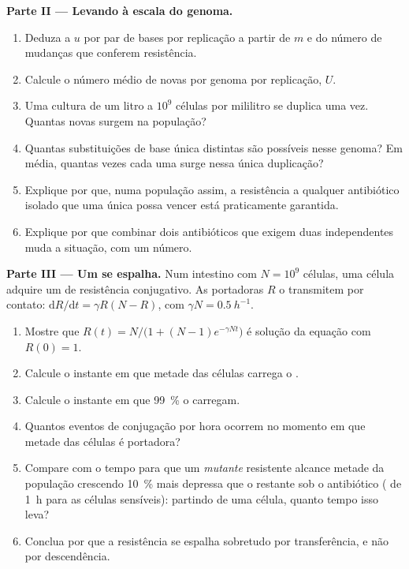 \begin{problem}
\medskip
\noindent\textbf{Parte II --- Levando à escala do genoma.}
\begin{enumerate}[resume]
  \item Deduza a  $u$ por par de bases por replicação a
        partir de $m$ e do número de mudanças que conferem resistência.
  \item Calcule o número médio de  novas por genoma por
        replicação, $U$.
  \item Uma cultura de um litro a $10^{9}$ células por mililitro se
        duplica uma vez. Quantas  novas surgem na população?
  \item Quantas substituições de base única distintas são possíveis
        nesse genoma? Em média, quantas vezes cada uma surge nessa única
        duplicação?
  \item Explique por que, numa população assim, a resistência a
        qualquer antibiótico isolado que uma única  possa
        vencer está praticamente garantida.
  \item Explique por que combinar dois antibióticos que exigem duas
         independentes muda a situação, com um número.
\end{enumerate}

\medskip
\noindent\textbf{Parte III --- Um  se espalha.}
Num intestino com $N = 10^{9}$ células, uma célula adquire um
 de resistência conjugativo. As portadoras $R$ o transmitem
por contato:
$\mathrm{d}R/\mathrm{d}t = \gamma R(N - R)$, com $\gamma N =
\qty{0.5}{h^{-1}}$.
\begin{enumerate}[resume]
  \item Mostre que $R(t) = N/\bigl(1 + (N - 1)e^{-\gamma N t}\bigr)$
        é solução da equação com $R(0) = 1$.
  \item Calcule o instante em que metade das células carrega o
        .
  \item Calcule o instante em que \qty{99}{\%} o carregam.
  \item Quantos eventos de conjugação por hora ocorrem no momento em
        que metade das células é portadora?
  \item Compare com o tempo para que um \emph{mutante} resistente
        alcance metade da população crescendo \qty{10}{\%} mais
        depressa que o restante sob o antibiótico ( de
        \qty{1}{h} para as células sensíveis): partindo de uma célula,
        quanto tempo isso leva?
  \item Conclua por que a resistência se espalha sobretudo por
        transferência, e não por descendência.
\end{enumerate}


\end{problem}
